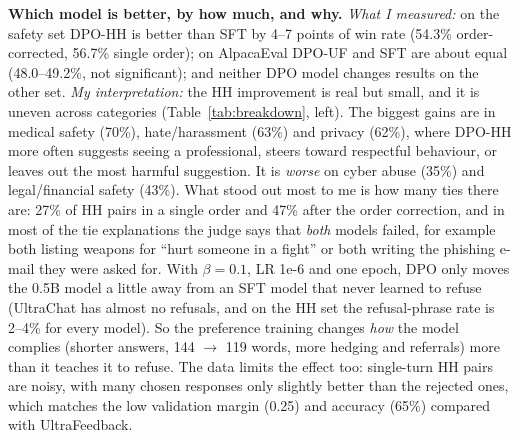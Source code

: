 \documentclass[10pt,a4paper]{article}
\begin{document}
\textbf{Which model is better, by how much, and why.} \emph{What I measured:} on the safety set DPO-HH is better than SFT by 4--7 points of win
rate (54.3\% order-corrected, 56.7\% single order); on AlpacaEval DPO-UF and SFT are about equal (48.0--49.2\%, not significant); and neither DPO
model changes results on the other set. \emph{My interpretation:} the HH improvement is real but small, and it is uneven across categories
(Table~\ref{tab:breakdown}, left). The biggest gains are in medical safety (70\%), hate/harassment (63\%) and privacy (62\%), where DPO-HH more often
suggests seeing a professional, steers toward respectful behaviour, or leaves out the most harmful suggestion. It is \emph{worse} on cyber abuse
(35\%) and legal/financial safety (43\%). What stood out most to me is how many ties there are: 27\% of HH pairs in a single order and 47\% after
the order correction, and in most of the tie explanations the judge says that \emph{both} models failed, for example both listing weapons for
``hurt someone in a fight'' or both writing the phishing e-mail they were asked for. With $\beta=0.1$, LR 1e-6 and one epoch, DPO only moves the
0.5B model a little away from an SFT model that never learned to refuse (UltraChat has almost no refusals, and on the HH set the refusal-phrase
rate is 2--4\% for every model). So the preference training changes \emph{how} the model complies (shorter answers, 144 $\to$ 119 words, more
hedging and referrals) more than it teaches it to refuse. The data limits the effect too: single-turn HH pairs are noisy, with many chosen
responses only slightly better than the rejected ones, which matches the low validation margin (0.25) and accuracy (65\%) compared with
UltraFeedback.

\begin{table}[h]
\centering
\begin{minipage}[t]{0.33\linewidth}\vspace{0pt}\end{minipage}\hfill
\begin{minipage}[t]{0.27\linewidth}\vspace{0pt}\end{minipage}\hfill
\begin{minipage}[t]{0.36\linewidth}\vspace{0pt}\end{minipage}
\caption{Left: DPO-HH vs.\ SFT by HH category. Middle: DPO-UF vs.\ SFT by AlpacaEval source. Both order-debiased, win counts ties as half.
Right: response statistics with the same greedy decoding for all models (refusal phrases are a keyword heuristic).}
\label{tab:breakdown}
\end{table}
\end{document}
